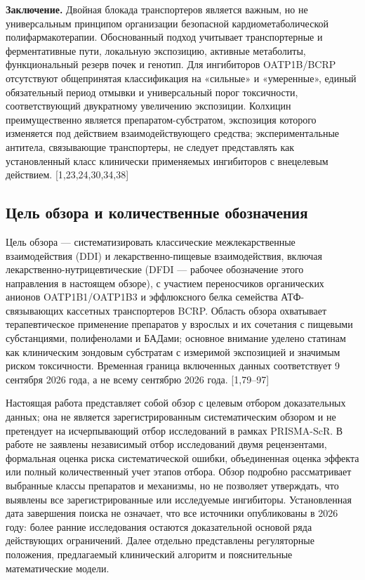 \documentclass[11pt]{article}
\begin{document}
\textbf{Заключение.} Двойная блокада транспортеров является важным, но не универсальным принципом организации безопасной кардиометаболической полифармакотерапии. Обоснованный подход учитывает транспортерные и ферментативные пути, локальную экспозицию, активные метаболиты, функциональный резерв почек и генотип. Для ингибиторов OATP1B/BCRP отсутствуют общепринятая классификация на «сильные» и «умеренные», единый обязательный период отмывки и универсальный порог токсичности, соответствующий двукратному увеличению экспозиции. Колхицин преимущественно является препаратом-субстратом, экспозиция которого изменяется под действием взаимодействующего средства; экспериментальные антитела, связывающие транспортеры, не следует представлять как установленный класс клинически применяемых ингибиторов с внецелевым действием. [1,23,24,30,34,38]

\subsection*{Цель обзора и количественные обозначения}

Цель обзора --- систематизировать классические межлекарственные взаимодействия (DDI) и лекарственно-пищевые взаимодействия, включая лекарственно-нутрицевтические (DFDI --- рабочее обозначение этого направления в настоящем обзоре), с участием переносчиков органических анионов OATP1B1/OATP1B3 и эффлюксного белка семейства АТФ-связывающих кассетных транспортеров BCRP. Область обзора охватывает терапевтическое применение препаратов у взрослых и их сочетания с пищевыми субстанциями, полифенолами и БАДами; основное внимание уделено статинам как клиническим зондовым субстратам с измеримой экспозицией и значимым риском токсичности. Временная граница включенных данных соответствует 9 сентября 2026 года, а не всему сентябрю 2026 года. [1,79--97]

Настоящая работа представляет собой обзор с целевым отбором доказательных данных; она не является зарегистрированным систематическим обзором и не претендует на исчерпывающий отбор исследований в рамках PRISMA-ScR. В работе не заявлены независимый отбор исследований двумя рецензентами, формальная оценка риска систематической ошибки, объединенная оценка эффекта или полный количественный учет этапов отбора. Обзор подробно рассматривает выбранные классы препаратов и механизмы, но не позволяет утверждать, что выявлены все зарегистрированные или исследуемые ингибиторы. Установленная дата завершения поиска не означает, что все источники опубликованы в 2026 году: более ранние исследования остаются доказательной основой ряда действующих ограничений. Далее отдельно представлены регуляторные положения, предлагаемый клинический алгоритм и пояснительные математические модели.
\end{document}

